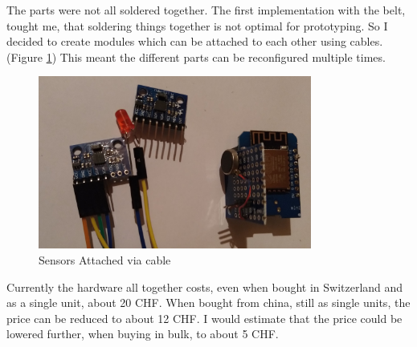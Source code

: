 The parts were not all soldered together. The first implementation with the belt, tought me, that soldering things together is not optimal for prototyping. So I decided to create modules which can be attached to each other using cables. (Figure \ref{fig:SensorsViaCable}) This meant the different parts can be reconfigured multiple times.


\begin{figure}[ht]
  \begin{center}
\includegraphics[width=0.8\textwidth]{images/PluginSensorCable.png}
  \end{center}
  \caption{Sensors Attached via cable}
  \label{fig:SensorsViaCable}
\end{figure}

Currently the hardware all together costs, even when bought in Switzerland and as a single unit, about 20 CHF. When bought from china, still as single units, the price can be reduced to about 12 CHF. I would estimate that the price could be lowered further, when buying in bulk, to about 5 CHF.



